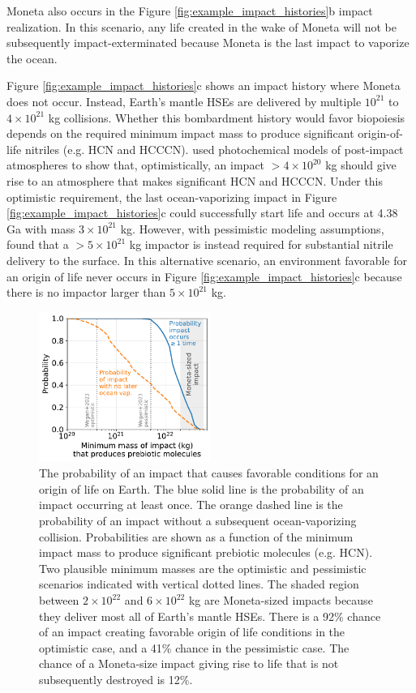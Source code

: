 \documentclass{aastex631}
\begin{document}
Moneta also occurs in the Figure \ref{fig:example_impact_histories}b impact realization. In this scenario, any life created in the wake of Moneta will not be subsequently impact-exterminated because Moneta is the last impact to vaporize the ocean.

Figure \ref{fig:example_impact_histories}c shows an impact history where Moneta does not occur. Instead, Earth's mantle HSEs are delivered by multiple $10^{21}$ to $4 \times 10^{21}$ kg collisions. Whether this bombardment history would favor biopoiesis depends on the required minimum impact mass to produce significant origin-of-life nitriles (e.g. HCN and HCCCN). \citet{Wogan_2023} used photochemical models of post-impact atmospheres to show that, optimistically, an impact $> 4 \times 10^{20}$ kg should give rise to an atmosphere that makes significant HCN and HCCCN. Under this optimistic requirement, the last ocean-vaporizing impact in Figure \ref{fig:example_impact_histories}c could successfully start life and occurs at 4.38 Ga with mass $3 \times 10^{21}$ kg. However, with pessimistic modeling assumptions, \citet{Wogan_2023} found that a $> 5 \times 10^{21}$ kg impactor is instead required for substantial nitrile delivery to the surface. In this alternative scenario, an environment favorable for an origin of life never occurs in Figure \ref{fig:example_impact_histories}c because there is no impactor larger than $5 \times 10^{21}$ kg.

\begin{figure}
  \centering
  \includegraphics[width=0.5\textwidth]{figures/probabilities_of_impacts.pdf}
  \caption{The probability of an impact that causes favorable conditions for an origin of life on Earth. The blue solid line is the probability of an impact occurring at least once. The orange dashed line is the probability of an impact without a subsequent ocean-vaporizing collision. Probabilities are shown as a function of the minimum impact mass to produce significant prebiotic molecules (e.g. HCN). Two plausible minimum masses are the \citet{Wogan_2023} optimistic and pessimistic scenarios indicated with vertical dotted lines. The shaded region between $2 \times 10^{22}$ and $6 \times 10^{22}$ kg are Moneta-sized impacts because they deliver most all of Earth's mantle HSEs. There is a 92\% chance of an impact creating favorable origin of life conditions in the \citet{Wogan_2023} optimistic case, and a 41\% chance in the pessimistic case. The chance of a Moneta-size impact giving rise to life that is not subsequently destroyed is 12\%.}
  \label{fig:probabilities_of_impacts}
\end{figure}
\end{document}
